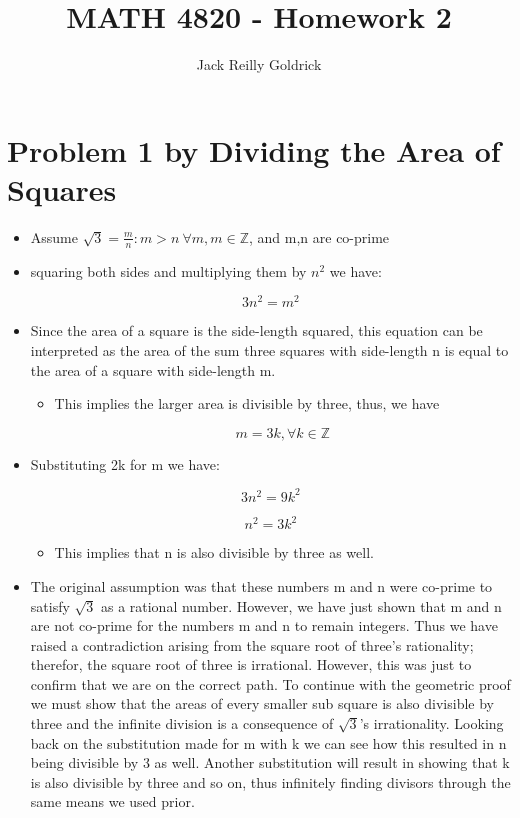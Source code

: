 \documentclass[]{report}
\title{MATH 4820 - Homework 2}
\author{Jack Reilly Goldrick}
\begin{document}
	\maketitle
	
	
\section{Problem 1 by Dividing the Area of Squares}
	
	\begin{itemize}
		\item Assume $\sqrt{3} = \frac{m}{n} : m > n \ \forall m,m \in \mathbb{Z}$, and m,n are co-prime
		
		\item squaring both sides and multiplying them by $n^2$ we have:
		
						$$ 3n^2 = m^2 $$
						
						
		\item Since the area of a square is the side-length squared, this equation can be interpreted as the area of the sum three squares with side-length n is equal to the area of a square with side-length m. 
		
			\begin{itemize}
				\item This implies the larger area is divisible by three, thus, we have
				
				$$ m = 3k, \forall k \in \mathbb{Z} $$
				
			\end{itemize}
			
			
			
			
			\item Substituting 2k for m we have:
			
			$$ 3n^2 = 9k^2 $$
			
			$$ n^2 = 3k^2 $$
			
			
			\begin{itemize}
				
				\item This implies that n is also divisible by three as well.
				
		\end{itemize}
		
		
		
		\item The original assumption was that these numbers m and n were co-prime to satisfy $\sqrt{3}$ as a rational number.  However, we have just shown that m and n are not co-prime for the numbers m and n to remain integers.  Thus we have raised a contradiction arising from the square root of three's rationality; therefor, the square root of three is irrational.  However, this was just to confirm that we are on the correct path.  To continue with the geometric proof we must show that the areas of every smaller sub square is also divisible by three and the infinite division is a consequence of $\sqrt{3}$'s irrationality.  Looking back on the substitution made for m with k we can see how this resulted in n being divisible by 3 as well.  Another substitution will result in showing that k is also divisible by three and so on, thus infinitely finding divisors through the same means we used prior.
		

\end{itemize}
\end{document}
